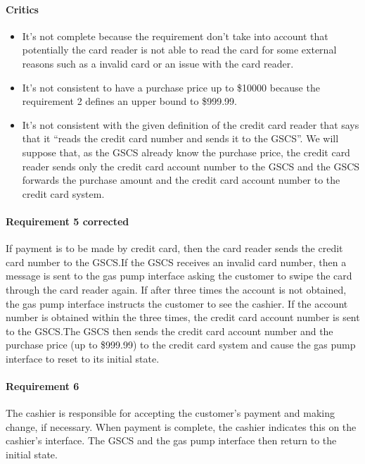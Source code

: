 \begin{framed}
    \paragraph{Critics}
    \begin{itemize}
        \item It's not complete because the requirement don't take into
            account that potentially the card reader is not able to read
            the card for some external reasons such as a invalid card or an
            issue with the card reader.
        \item It's not consistent to have a purchase price up to \$10000
            because the requirement 2 defines an upper bound to \$999.99.
        \item It's not consistent with the given definition of the credit card
            reader that says that it \enquote{reads the credit card number and
            sends it to the GSCS}. We will suppose that, as the GSCS already
            know the purchase price, the credit card reader sends only the
            credit card account number to the GSCS and the GSCS forwards the
            purchase amount and the credit card account number to the credit
            card system.
    \end{itemize}

    \paragraph{Requirement 5 corrected} If payment is to be made by credit card, then the
    card reader sends the credit card number to the GSCS.\@ If the GSCS receives
    an invalid card number, then a message is sent to the gas pump interface
    asking the customer to swipe the card through the card reader again.
    If after three times the account is not obtained, the gas pump
    interface instructs the customer to see the cashier.
    If the account number is obtained within the three times, the
    credit card account number is sent to the GSCS.\@ The GSCS then sends the
    credit card account number and the purchase price (up to \$999.99) to the
    credit card system and cause the gas pump interface to
    reset to its initial state.
\end{framed}

\paragraph{Requirement 6} The cashier is responsible for accepting the
customer's payment and making change, if necessary. When payment is
complete, the cashier indicates this on the cashier's interface. The GSCS
and the gas pump interface then return to the initial state.


